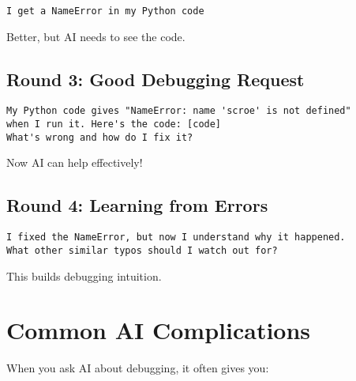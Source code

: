 \documentclass[
  letterpaper,
  DIV=11,
  numbers=noendperiod,
  oneside]{scrreprt}
\begin{document}
\begin{verbatim}
I get a NameError in my Python code
\end{verbatim}

Better, but AI needs to see the code.

\subsection{Round 3: Good Debugging
Request}\label{round-3-good-debugging-request}

\begin{verbatim}
My Python code gives "NameError: name 'scroe' is not defined" 
when I run it. Here's the code: [code]
What's wrong and how do I fix it?
\end{verbatim}

Now AI can help effectively!

\subsection{Round 4: Learning from
Errors}\label{round-4-learning-from-errors}

\begin{verbatim}
I fixed the NameError, but now I understand why it happened. 
What other similar typos should I watch out for?
\end{verbatim}

This builds debugging intuition.

\section{Common AI Complications}\label{common-ai-complications-8}

When you ask AI about debugging, it often gives you:
\end{document}
